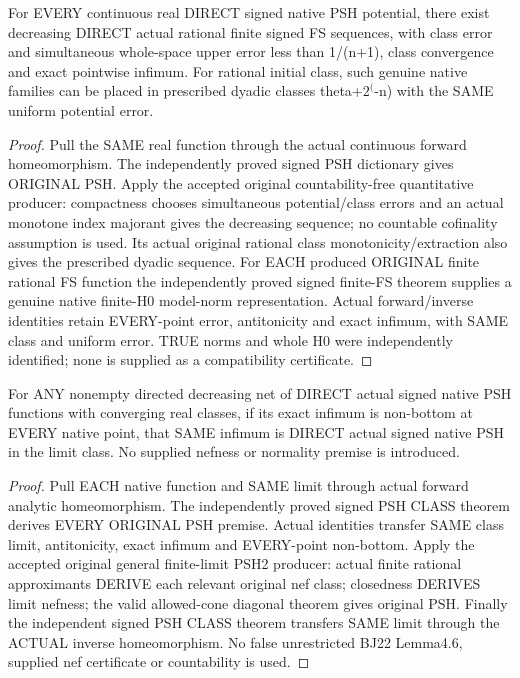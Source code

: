 \begin{theorem}
\label{thm:seven-native-signed-continuous-finite-fs-sequences}
\leanok
For EVERY continuous real DIRECT signed native PSH potential, there
exist decreasing DIRECT actual rational finite signed FS sequences,
with class error and simultaneous whole-space upper error less than
1/(n+1), class convergence and exact pointwise infimum. For rational
initial class, such genuine native families can be placed in prescribed
dyadic classes theta+$2^($-n) with the SAME uniform potential error.
\end{theorem}
\begin{proof}
Pull the SAME real function through the actual continuous forward
homeomorphism. The independently proved signed PSH dictionary gives
ORIGINAL PSH. Apply the accepted original countability-free quantitative
producer: compactness chooses simultaneous potential/class errors and
an actual monotone index majorant gives the decreasing sequence; no
countable cofinality assumption is used. Its actual original rational
class monotonicity/extraction also gives the prescribed dyadic sequence.
For EACH produced ORIGINAL finite rational FS function the independently
proved signed finite-FS theorem supplies a genuine native finite-H0
model-norm representation. Actual forward/inverse identities retain
EVERY-point error, antitonicity and exact infimum, with SAME class and
uniform error. TRUE norms and whole H0 were independently identified;
none is supplied as a compatibility certificate.
\end{proof}

\begin{theorem}
\label{thm:seven-native-signed-finite-limit-psh2}
\leanok
For ANY nonempty directed decreasing net of DIRECT actual signed native
PSH functions with converging real classes, if its exact infimum is
non-bottom at EVERY native point, that SAME infimum is DIRECT actual
signed native PSH in the limit class. No supplied nefness or normality
premise is introduced.
\end{theorem}
\begin{proof}
Pull EACH native function and SAME limit through actual forward analytic
homeomorphism. The independently proved signed PSH CLASS theorem derives
EVERY ORIGINAL PSH premise. Actual identities transfer SAME class limit,
antitonicity, exact infimum and EVERY-point non-bottom. Apply the accepted
original general finite-limit PSH2 producer: actual finite rational
approximants DERIVE each relevant original nef class; closedness DERIVES
limit nefness; the valid allowed-cone diagonal theorem gives original
PSH. Finally the independent signed PSH CLASS theorem transfers SAME
limit through the ACTUAL inverse homeomorphism. No false unrestricted
BJ22 Lemma4.6, supplied nef certificate or countability is used.
\end{proof}


